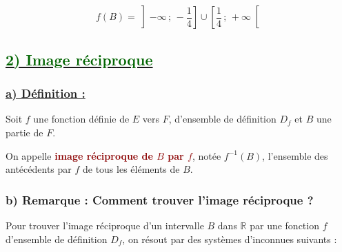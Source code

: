 \documentclass[12pt,a4paper]{article}
\begin{document}
\[
\boxed{
f(B)=
\left]-\infty\,;\,-\frac{1}{4}\right]
\cup
\left[\frac{1}{4}\,;\,+\infty\right[
}
\]

\subsection*{\underline{\textbf{\textcolor{darkgreen}{2) Image réciproque}}}}

\subsubsection*{\underline{\textbf{a) Définition :}}}

Soit $f$ une fonction définie de $E$ vers $F$, d'ensemble de définition
$D_f$ et $B$ une partie de $F$.

On appelle \textcolor{darkred}{\textbf{image réciproque de $B$ par $f$}},
notée $f^{-1}(B)$, l'ensemble des antécédents par $f$ de tous les éléments de $B$.

\subsubsection*{\textbf{b) Remarque : Comment trouver l'image réciproque ?}}

Pour trouver l'image réciproque d'un intervalle $B$ dans $\mathbb{R}$ par une
fonction $f$ d'ensemble de définition $D_f$, on résout par des systèmes
d'inconnues suivants :
\end{document}
